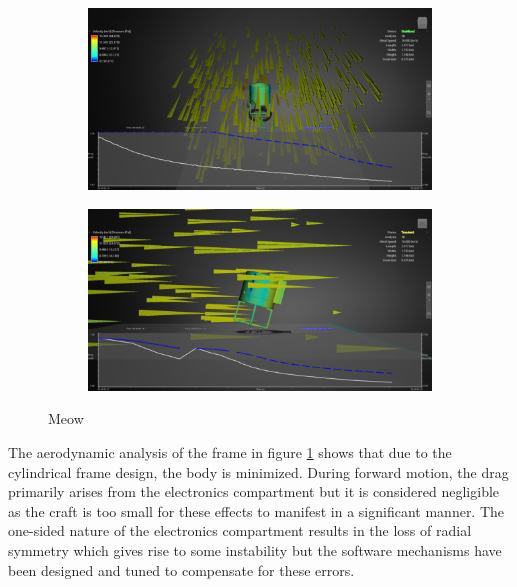 \documentclass[12pt]{article}
\begin{document}
\begin{figure}[t]
	\centering
	\begin{subfigure}{0.5\textwidth}
		\centering
		\includegraphics[width=0.9\linewidth]{aerodynamic-1.png}
	\end{subfigure}%
	\begin{subfigure}{0.5\textwidth}
		\centering
		\includegraphics[width=0.9\linewidth]{aerodynamic-2.png}
	\end{subfigure}
	\caption{Meow}
	\label{fig:aerodynamic}
\end{figure}

The aerodynamic analysis of the frame in figure \ref{fig:aerodynamic} shows that due to the cylindrical frame design, the body is minimized. During forward motion, the drag primarily arises from the electronics compartment but it is considered negligible as the craft is too small for these effects to manifest in a significant manner. The one-sided nature of the electronics compartment results in the loss of radial symmetry which gives rise to some instability but the software mechanisms have been designed and tuned to compensate for these errors.
\end{document}
